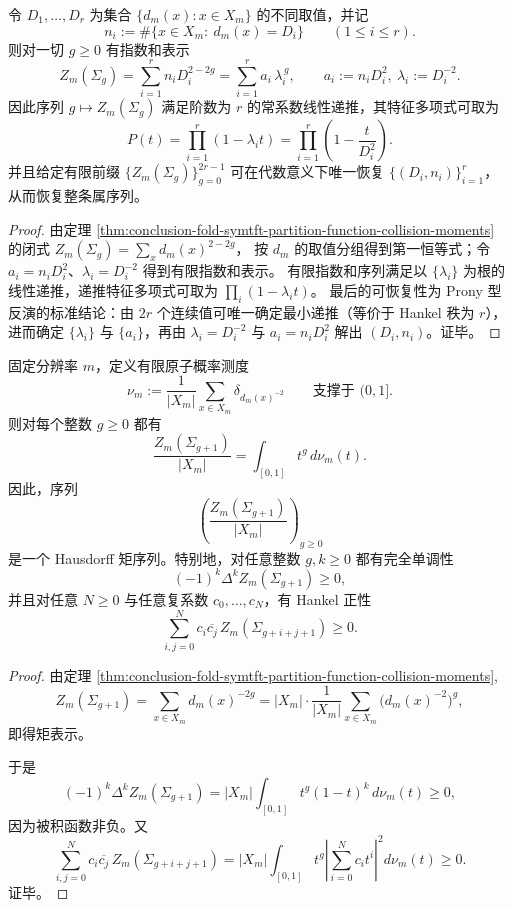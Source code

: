 \begin{proposition}[属序列的有限线性递推与纤维谱的可恢复性]\label{prop:conclusion-tqft-genus-linear-recurrence-recovery}
令 \(D_1,\dots,D_r\) 为集合 \(\{d_m(x):x\in X_m\}\) 的不同取值，并记
\[
n_i:=\#\{x\in X_m:\ d_m(x)=D_i\}\qquad(1\le i\le r).
\]
则对一切 \(g\ge 0\) 有指数和表示
\[
Z_m(\Sigma_g)=\sum_{i=1}^r n_iD_i^{2-2g}
=\sum_{i=1}^r a_i\,\lambda_i^{\,g},
\qquad
a_i:=n_iD_i^2,\ \lambda_i:=D_i^{-2}.
\]
因此序列 \(g\mapsto Z_m(\Sigma_g)\) 满足阶数为 \(r\) 的常系数线性递推，其特征多项式可取为
\[
P(t)=\prod_{i=1}^r(1-\lambda_i t)=\prod_{i=1}^r\left(1-\frac{t}{D_i^{2}}\right).
\]
并且给定有限前缀 \(\{Z_m(\Sigma_g)\}_{g=0}^{2r-1}\) 可在代数意义下唯一恢复 \(\{(D_i,n_i)\}_{i=1}^r\)，从而恢复整条属序列。
\end{proposition}
\begin{proof}
由定理 \ref{thm:conclusion-fold-symtft-partition-function-collision-moments} 的闭式
\(
Z_m(\Sigma_g)=\sum_x d_m(x)^{2-2g}
\)，
按 \(d_m\) 的取值分组得到第一恒等式；令 \(a_i=n_iD_i^2\)、\(\lambda_i=D_i^{-2}\) 得到有限指数和表示。
有限指数和序列满足以 \(\{\lambda_i\}\) 为根的线性递推，递推特征多项式可取为 \(\prod_i(1-\lambda_i t)\)。
最后的可恢复性为 Prony 型反演的标准结论：由 \(2r\) 个连续值可唯一确定最小递推（等价于 Hankel 秩为 \(r\)），进而确定 \(\{\lambda_i\}\) 与 \(\{a_i\}\)，再由 \(\lambda_i=D_i^{-2}\) 与 \(a_i=n_iD_i^2\) 解出 \((D_i,n_i)\)。证毕。
\end{proof}

\begin{theorem}\label{thm:conclusion-tqft-genus-hausdorff-moment-sequence}
固定分辨率 \(m\)，定义有限原子概率测度
\[
\nu_m:=\frac{1}{|X_m|}\sum_{x\in X_m}\delta_{d_m(x)^{-2}}
\qquad\text{支撑于 }(0,1].
\]
则对每个整数 \(g\ge 0\) 都有
\[
\frac{Z_m(\Sigma_{g+1})}{|X_m|}
=
\int_{[0,1]} t^g\,d\nu_m(t).
\]
因此，序列
\[
\left(\frac{Z_m(\Sigma_{g+1})}{|X_m|}\right)_{g\ge 0}
\]
是一个 Hausdorff 矩序列。特别地，对任意整数 \(g,k\ge 0\) 都有完全单调性
\[
(-1)^k\Delta^k Z_m(\Sigma_{g+1})\ge 0,
\]
并且对任意 \(N\ge 0\) 与任意复系数 \(c_0,\dots,c_N\)，有 Hankel 正性
\[
\sum_{i,j=0}^{N}c_i\overline{c_j}\,Z_m(\Sigma_{g+i+j+1})\ge 0.
\]
\end{theorem}
\begin{proof}
由定理 \ref{thm:conclusion-fold-symtft-partition-function-collision-moments},
\[
Z_m(\Sigma_{g+1})
=
\sum_{x\in X_m}d_m(x)^{-2g}
=
|X_m|\cdot \frac{1}{|X_m|}\sum_{x\in X_m}\bigl(d_m(x)^{-2}\bigr)^g,
\]
即得矩表示。

于是
\[
(-1)^k\Delta^k Z_m(\Sigma_{g+1})
=
|X_m|\int_{[0,1]} t^g(1-t)^k\,d\nu_m(t)\ge 0,
\]
因为被积函数非负。又
\[
\sum_{i,j=0}^{N}c_i\overline{c_j}\,Z_m(\Sigma_{g+i+j+1})
=
|X_m|\int_{[0,1]}t^g\left|\sum_{i=0}^{N}c_it^i\right|^2d\nu_m(t)\ge 0.
\]
证毕。
\end{proof}

